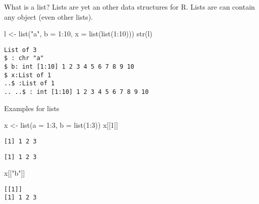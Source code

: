 \documentclass[ignorenonframetext,,t]{beamer}
\newenvironment{Shaded}{\begin{snugshade}}{\end{snugshade}}
\newcommand{\AttributeTok}[1]{\textcolor[rgb]{0.77,0.63,0.00}{#1}}
\newcommand{\DecValTok}[1]{\textcolor[rgb]{0.00,0.00,0.81}{#1}}
\newcommand{\FunctionTok}[1]{\textcolor[rgb]{0.00,0.00,0.00}{#1}}
\newcommand{\NormalTok}[1]{#1}
\newcommand{\OtherTok}[1]{\textcolor[rgb]{0.56,0.35,0.01}{#1}}
\newcommand{\SpecialCharTok}[1]{\textcolor[rgb]{0.00,0.00,0.00}{#1}}
\newcommand{\StringTok}[1]{\textcolor[rgb]{0.31,0.60,0.02}{#1}}
\begin{document}
\begin{frame}[fragile]
\begin{block}{What is a list?}
\protect\hypertarget{what-is-a-list}{}
Lists are yet an other data structures for R. Lists are can contain any
object (even other lists).

\begin{Shaded}
\begin{Highlighting}[]
\NormalTok{l }\OtherTok{\textless{}{-}} \FunctionTok{list}\NormalTok{(}\StringTok{"a"}\NormalTok{, }\AttributeTok{b =} \DecValTok{1}\SpecialCharTok{:}\DecValTok{10}\NormalTok{, }\AttributeTok{x =} \FunctionTok{list}\NormalTok{(}\FunctionTok{list}\NormalTok{(}\DecValTok{1}\SpecialCharTok{:}\DecValTok{10}\NormalTok{)))}
\FunctionTok{str}\NormalTok{(l)}
\end{Highlighting}
\end{Shaded}

\begin{verbatim}
List of 3
$ : chr "a"
$ b: int [1:10] 1 2 3 4 5 6 7 8 9 10
$ x:List of 1
..$ :List of 1
.. ..$ : int [1:10] 1 2 3 4 5 6 7 8 9 10
\end{verbatim}
\end{block}
\end{frame}

\begin{frame}[fragile]
\begin{block}{Examples for lists}
\protect\hypertarget{examples-for-lists}{}
\begin{Shaded}
\begin{Highlighting}[]
\NormalTok{x }\OtherTok{\textless{}{-}} \FunctionTok{list}\NormalTok{(}\AttributeTok{a =} \DecValTok{1}\SpecialCharTok{:}\DecValTok{3}\NormalTok{, }\AttributeTok{b =} \FunctionTok{list}\NormalTok{(}\DecValTok{1}\SpecialCharTok{:}\DecValTok{3}\NormalTok{))}
\NormalTok{x[[}\DecValTok{1}\NormalTok{]]}
\end{Highlighting}
\end{Shaded}

\begin{verbatim}
[1] 1 2 3
\end{verbatim}

\begin{Shaded}
\end{Shaded}

\begin{verbatim}
[1] 1 2 3
\end{verbatim}

\begin{Shaded}
\begin{Highlighting}[]
\NormalTok{x[[}\StringTok{"b"}\NormalTok{]]}
\end{Highlighting}
\end{Shaded}

\begin{verbatim}
[[1]]
[1] 1 2 3
\end{verbatim}
\end{block}
\end{frame}
\end{document}
